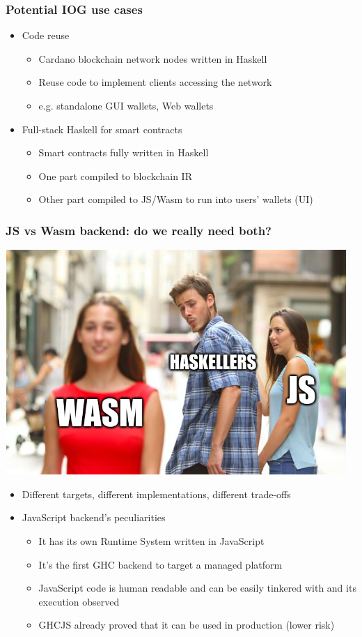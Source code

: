 \documentclass{beamer}
\begin{document}
\begin{frame}
\frametitle{Potential IOG use cases}
\begin{itemize}
\item Code reuse
\begin{itemize}
\item Cardano blockchain network nodes written in Haskell
\item Reuse code to implement clients accessing the network
\item e.g. standalone GUI wallets, Web wallets
\end{itemize}
\item Full-stack Haskell for smart contracts
\begin{itemize}
\item Smart contracts fully written in Haskell
\item One part compiled to blockchain IR
\item Other part compiled to JS/Wasm to run into users’ wallets (UI)
\end{itemize}
\end{itemize}
\end{frame}


\begin{frame}
\frametitle{ JS vs Wasm backend: do we really need both?}
\begin{center}
\includegraphics[scale=0.2]{images/js_vs_wasm.png}
\end{center}
\begin{itemize}
\item Different targets, different implementations, different trade-offs
\item JavaScript backend’s peculiarities
\begin{itemize}
\item It has its own Runtime System written in JavaScript
\item It’s the first GHC backend to target a managed platform
\item JavaScript code is human readable and can be easily tinkered with and its execution observed
\item GHCJS already proved that it can be used in production (lower risk)
\end{itemize}
\end{itemize}
\end{frame}
\end{document}
